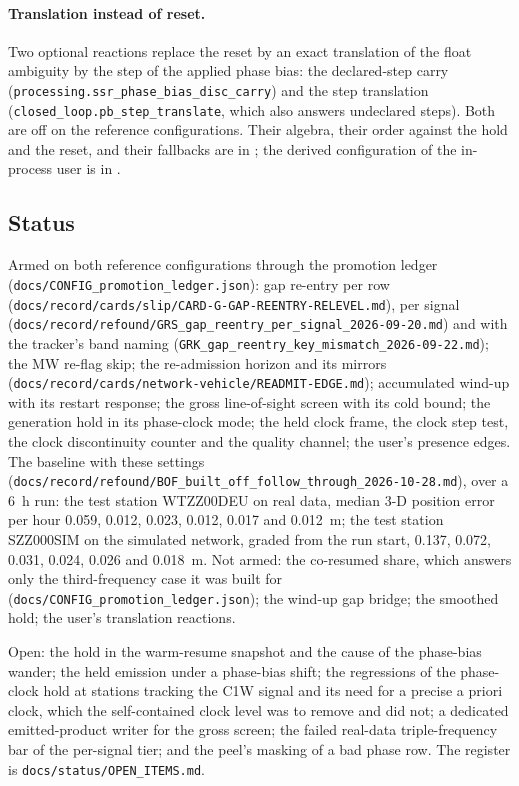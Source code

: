 \documentclass[main.tex]{subfiles}
\begin{document}
\paragraph{Translation instead of reset.}
Two optional reactions replace the reset by an exact translation of the
float ambiguity by the step of the applied phase bias: the declared-step
carry (\texttt{processing.ssr\_phase\_bias\_disc\_carry}) and the step
translation (\texttt{closed\_loop.pb\_step\_translate}, which also answers
undeclared steps). Both are off on the reference configurations. Their
algebra, their order against the hold and the reset, and their fallbacks are
in ;
the derived configuration of the in-process user is in
.

\subsection{Status}\label{sec:net-wire-standing}

Armed on both reference configurations through the promotion ledger
(\texttt{docs/CONFIG\_promotion\_ledger.json}): gap re-entry per row
(\texttt{docs/record/cards/slip/CARD-G-GAP-REENTRY-RELEVEL.md}), per signal
(\texttt{docs/record/refound/GRS\_gap\_reentry\_per\_signal\_2026-09-20.md}) and with
the tracker's band naming
(\texttt{GRK\_gap\_reentry\_key\_mismatch\_2026-09-22.md}); the MW re-flag
skip; the re-admission horizon and its mirrors
(\texttt{docs/record/cards/network-vehicle/READMIT-EDGE.md}); accumulated wind-up
with its restart response; the gross line-of-sight screen with its cold bound;
the generation hold in its phase-clock mode; the held clock frame, the clock
step test, the clock discontinuity counter and the quality channel; the
user's presence edges. The baseline with these settings
(\texttt{docs/record/refound/BOF\_built\_off\_follow\_through\_2026-10-28.md}), over a
6~h run: the test station WTZZ00DEU on real data, median 3-D position error
per hour 0.059, 0.012, 0.023, 0.012, 0.017 and 0.012~m; the test station
SZZ000SIM on the simulated network, graded from the run start, 0.137, 0.072,
0.031, 0.024, 0.026 and 0.018~m. Not armed: the co-resumed share, which answers
only the third-frequency case it was built for
(\texttt{docs/CONFIG\_promotion\_ledger.json}); the wind-up gap bridge; the
smoothed hold; the user's translation reactions.

Open: the hold in the warm-resume snapshot and the cause of the
phase-bias wander; the held emission under a phase-bias shift; the
regressions of the phase-clock hold at stations tracking the C1W signal and
its need for a precise a priori clock, which the self-contained clock level
was to remove and did not; a dedicated emitted-product writer for the gross
screen; the failed real-data triple-frequency bar of the per-signal tier; and
the peel's masking of a bad phase row. The register is
\texttt{docs/status/OPEN\_ITEMS.md}.

\ifSubfilesClassLoaded{\printbibliography}{}
\end{document}
